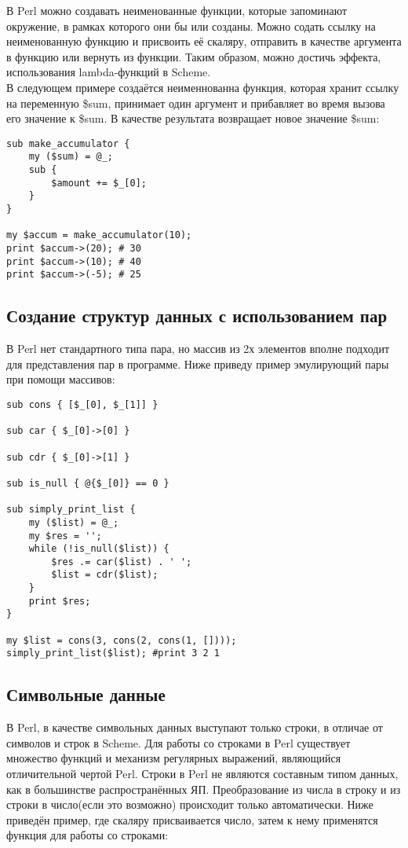 \documentclass[11pt,a4paper]{article}
\begin{document}
В Perl можно создавать неименованные функции, которые запоминают
окружение, в рамках которого они бы или созданы. Можно содать ссылку
на неименованную функцию и присвоить её скаляру, отправить в качестве
аргумента в функцию или вернуть из функции. Таким образом, можно
достичь эффекта, использования lambda-функций в Scheme.\\
В следующем примере создаётся неименнованна функция, которая хранит
ссылку на переменную \$sum, принимает один аргумент и прибавляет во
время вызова его значение к \$sum. В качестве результата возвращает
новое значение \$sum:
\begin{lstlisting} 
sub make_accumulator {
    my ($sum) = @_;
    sub {
        $amount += $_[0];
    }
}

my $accum = make_accumulator(10);
print $accum->(20); # 30 
print $accum->(10); # 40 
print $accum->(-5); # 25 
\end{lstlisting} 

\subsection*{Создание структур данных с использованием пар}
В Perl нет стандартного типа пара, но массив из 2х элементов вполне
подходит для представления пар в программе. Ниже приведу пример
эмулирующий пары при помощи массивов:

\begin{lstlisting} 
sub cons { [$_[0], $_[1]] }

sub car { $_[0]->[0] }

sub cdr { $_[0]->[1] }

sub is_null { @{$_[0]} == 0 }

sub simply_print_list {
    my ($list) = @_;
    my $res = '';
    while (!is_null($list)) {
        $res .= car($list) . ' ';
        $list = cdr($list);
    }
    print $res;
}

my $list = cons(3, cons(2, cons(1, [])));
simply_print_list($list); #print 3 2 1

\end{lstlisting} 

\subsection*{Символьные данные}
В Perl, в качестве символьных данных выступают только строки, в
отличае от символов и строк в Scheme. Для работы со строками в Perl
существует множество функций и механизм регулярных выражений,
являющийся отличительной чертой Perl. Строки в Perl не являются
составным типом данных, как в большинстве распространённых
ЯП. Преобразование из числа в строку и из строки в число(если это
возможно) происходит только автоматически. Ниже приведён пример, где
скаляру присваивается число, затем к нему применятся функция для
работы со строками:
\end{document}
